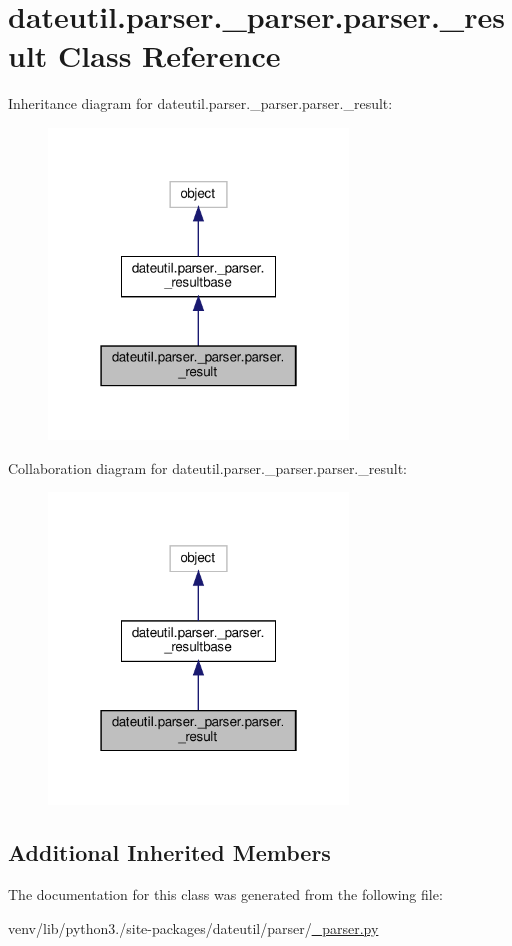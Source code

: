 \hypertarget{classdateutil_1_1parser_1_1__parser_1_1parser_1_1__result}{}\section{dateutil.\+parser.\+\_\+parser.\+parser.\+\_\+result Class Reference}
\label{classdateutil_1_1parser_1_1__parser_1_1parser_1_1__result}


Inheritance diagram for dateutil.\+parser.\+\_\+parser.\+parser.\+\_\+result\+:
\nopagebreak
\begin{figure}[H]
\begin{center}
\leavevmode
\includegraphics[width=226pt]{classdateutil_1_1parser_1_1__parser_1_1parser_1_1__result__inherit__graph}
\end{center}
\end{figure}


Collaboration diagram for dateutil.\+parser.\+\_\+parser.\+parser.\+\_\+result\+:
\nopagebreak
\begin{figure}[H]
\begin{center}
\leavevmode
\includegraphics[width=226pt]{classdateutil_1_1parser_1_1__parser_1_1parser_1_1__result__coll__graph}
\end{center}
\end{figure}
\subsection*{Additional Inherited Members}


The documentation for this class was generated from the following file\+:\begin{DoxyCompactItemize}
\item 
venv/lib/python3./site-\/packages/dateutil/parser/\hyperlink{dateutil_2parser_2__parser_8py}{\+\_\+parser.\+py}\end{DoxyCompactItemize}
